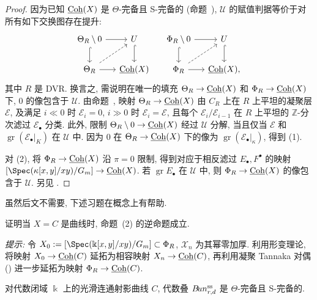 \begin{proof}
因为已知 $\underline{\mathrm{Coh}}(X)$ 是 $\Theta$-完备且 S-完备的 (命题~), $\mathcal U$ 的赋值判据等价于对所有如下交换图存在提升:
\[
\begin{tikzcd}[ampersand replacement=\&,column sep=small]
\Theta_R\setminus0\arrow[r]\arrow[d,hook]\&\mathcal U\arrow[d,hook]\&\Phi_R\setminus0\arrow[r]\arrow[d,hook]\&\mathcal U\arrow[d,hook]\\
\Theta_R\arrow[r]\arrow[ur,dashed]\&\Coh(X)\&\Phi_R\arrow[r]\arrow[ur,dashed]\&\Coh(X),
\end{tikzcd}
\]
其中 $R$ 是 DVR. 换言之, 需说明在唯一的填充 $\Theta_R\to\underline{\mathrm{Coh}}(X)$ 和 $\Phi_R\to\underline{\mathrm{Coh}}(X)$ 下, $0$ 的像包含于 $\mathcal U$. 由命题~, 映射 $\Theta_R\to\underline{\mathrm{Coh}}(X)$ 由 $C_R$ 上在 $R$ 上平坦的凝聚层 $\mathcal E$, 及满足 $i\ll0$ 时 $\mathcal E_i=0$, $i\gg0$ 时 $\mathcal E_i=\mathcal E$, 且每个 $\mathcal E_i/\mathcal E_{i-1}$ 在 $R$ 上平坦的 $\mathbb Z$-分次滤过 $\mathcal E_\bullet$ 分类. 此外, 限制 $\Theta_R\setminus0\to\underline{\mathrm{Coh}}(X)$ 经过 $\mathcal U$ 分解, 当且仅当 $\mathcal E$ 和 $\operatorname{gr}(\mathcal E_\bullet|_K)$ 在 $\mathcal U$ 中. 因为 $0$ 在 $\Theta_R\to\underline{\mathrm{Coh}}(X)$ 下的像为 $\operatorname{gr}(\mathcal E_\bullet|_\kappa)$, 得到 (1).

对 (2), 将 $\Phi_R\to\underline{\mathrm{Coh}}(X)$ 沿 $\pi=0$ 限制, 得到对应于相反滤过 $E_\bullet,F^\bullet$ 的映射 $[\Spec(\kappa[x,y]/xy)/\mathbb G_m]\to\Coh(X)$. 若 $\operatorname{gr}E_\bullet$ 在 $\mathcal U$ 中, 则 $\Phi_R\to\underline{\mathrm{Coh}}(X)$ 的像包含于 $\mathcal U$. 另见 \cite[命题 3.17]{WZ25}.
\end{proof}
虽然后文不需要, 下述习题在概念上有帮助.
\begin{exercise}\label{src:9.3.7}
证明当 $X=C$ 是曲线时, 命题~(2) 的逆命题成立.

\textit{提示:} 令 $\mathcal X_0:=[\Spec(\Bbbk[x,y]/xy)/\mathbb G_m]\subset\Phi_R$, $\mathcal X_n$ 为其幂零加厚. 利用形变理论, 将映射 $X_0\to\underline{\mathrm{Coh}}(C)$ 延拓为相容映射 $X_n\to\underline{\mathrm{Coh}}(C)$, 再利用凝聚 Tannaka 对偶 () 进一步延拓为映射 $\Phi_R\to\underline{\mathrm{Coh}}(C)$.
\end{exercise}
\begin{proposition}\label{src:9.3.8}
对代数闭域 $\Bbbk$ 上的光滑连通射影曲线 $C$, 代数叠 $B\!un_{r,d}^{\mathrm{ss}}$ 是 $\Theta$-完备且 S-完备的.
\end{proposition}
